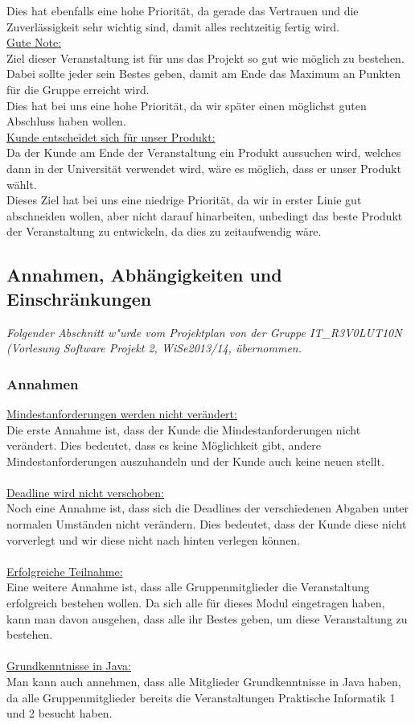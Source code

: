 \documentclass[fontsize=12pt,paper=a4,twoside]{scrartcl}
\begin{document}
Dies hat ebenfalls eine hohe Priorität, da gerade das Vertrauen und die Zuverlässigkeit sehr wichtig sind, damit alles rechtzeitig fertig wird.
\bigskip \\
\underline{Gute Note:}\\
Ziel dieser Veranstaltung ist für uns das Projekt so gut wie möglich zu bestehen. Dabei sollte jeder sein Bestes geben, damit am Ende das Maximum an Punkten für die Gruppe erreicht wird.\\
Dies hat bei uns eine hohe Priorität, da wir später einen möglichst guten Abschluss haben wollen.
\bigskip \\
\underline{Kunde entscheidet sich für unser Produkt:}\\
Da der Kunde am Ende der Veranstaltung ein Produkt aussuchen wird, welches dann in der Universität verwendet wird, wäre es möglich, dass er unser Produkt wählt.\\
Dieses Ziel hat bei uns eine niedrige Priorität, da wir in erster Linie gut abschneiden wollen, aber nicht darauf hinarbeiten, unbedingt das beste Produkt der Veranstaltung zu entwickeln, da dies zu zeitaufwendig wäre.


\subsection{Annahmen, Abhängigkeiten und Einschränkungen}
\textit{Folgender Abschnitt w"urde vom Projektplan von der Gruppe IT\_R3V0LUT10N (Vorlesung Software Projekt 2, WiSe2013/14, übernommen.}\\
\subsubsection{Annahmen}
\underline{Mindestanforderungen werden nicht verändert:} \\
Die erste Annahme ist, dass der Kunde die Mindestanforderungen nicht verändert. Dies bedeutet, dass es keine Möglichkeit gibt, andere Mindestanforderungen auszuhandeln und der Kunde auch keine neuen stellt.\\
\bigskip \\
\underline{Deadline wird nicht verschoben:} \\
Noch eine Annahme ist, dass sich die Deadlines der verschiedenen Abgaben unter normalen Umständen nicht verändern. Dies bedeutet, dass der Kunde diese nicht vorverlegt und wir diese nicht nach hinten verlegen können. \\
\bigskip \\
\underline{Erfolgreiche Teilnahme:} \\
Eine weitere Annahme ist, dass alle Gruppenmitglieder die Veranstaltung erfolgreich bestehen wollen. Da sich alle für dieses Modul eingetragen haben, kann man davon ausgehen, dass alle ihr Bestes geben, um diese Veranstaltung zu bestehen.\\
\bigskip \\
\underline{Grundkenntnisse in Java:} \\
Man kann auch annehmen, dass alle Mitglieder Grundkenntnisse in Java haben, da alle Gruppenmitglieder bereits die Veranstaltungen Praktische Informatik 1 und 2 besucht haben.\\
\end{document}
